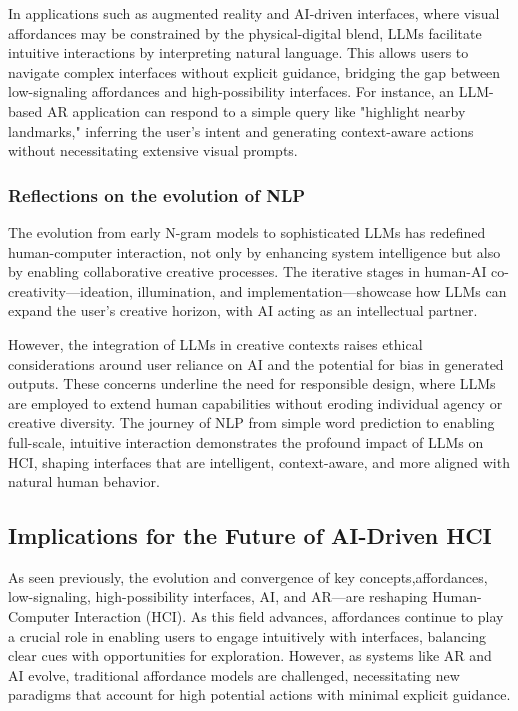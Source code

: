 In applications such as augmented reality and AI-driven interfaces, where visual affordances may be constrained by the physical-digital blend, LLMs facilitate intuitive interactions by interpreting natural language.
This allows users to navigate complex interfaces without explicit guidance, bridging the gap between low-signaling affordances and high-possibility interfaces.
For instance, an LLM-based AR application can respond to a simple query like "highlight nearby landmarks," inferring the user's intent and generating context-aware actions without necessitating extensive visual prompts.

\subsubsection{Reflections on the evolution of NLP}

The evolution from early N-gram models to sophisticated LLMs has redefined human-computer interaction, not only by enhancing system intelligence but also by enabling collaborative creative processes.
The iterative stages in human-AI co-creativity—ideation, illumination, and implementation—showcase how LLMs can expand the user’s creative horizon, with AI acting as an intellectual partner\cite{Wan2023ItFL}.

However, the integration of LLMs in creative contexts raises ethical considerations around user reliance on AI and the potential for bias in generated outputs.
These concerns underline the need for responsible design, where LLMs are employed to extend human capabilities without eroding individual agency or creative diversity\cite{Yang2024HumanAIII}.
The journey of NLP from simple word prediction to enabling full-scale, intuitive interaction demonstrates the profound impact of LLMs on HCI, shaping interfaces that are intelligent, context-aware, and more aligned with natural human behavior.

\subsection{Implications for the Future of AI-Driven HCI}

As seen previously, the evolution and convergence of key concepts,affordances, low-signaling, high-possibility interfaces, AI, and AR—are reshaping Human-Computer Interaction (HCI).
As this field advances, affordances continue to play a crucial role in enabling users to engage intuitively with interfaces, balancing clear cues with opportunities for exploration.
However, as systems like AR and AI evolve, traditional affordance models are challenged, necessitating new paradigms that account for high potential actions with minimal explicit guidance.


